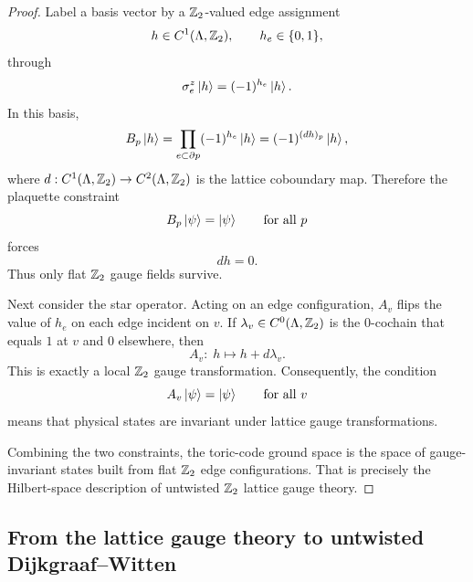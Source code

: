 \begin{proof}
Label a basis vector by a $\mathbb{Z}_2$-valued edge assignment
\begin{equation*}
h\in C^1(\Lambda,\mathbb{Z}_2),
\qquad
h_e\in \{0,1\},
\end{equation*}
through
\begin{equation*}
\sigma_e^z\ket{h}=(-1)^{h_e}\ket{h}.
\end{equation*}
In this basis,
\begin{equation*}
B_p\ket{h}
=
\prod_{e\subset \partial p}(-1)^{h_e}\ket{h}
=
(-1)^{(dh)_p}\ket{h},
\end{equation*}
where $d:C^1(\Lambda,\mathbb{Z}_2)\to C^2(\Lambda,\mathbb{Z}_2)$ is the lattice coboundary map. Therefore the plaquette constraint
\begin{equation*}
B_p\ket{\psi}=\ket{\psi}
\qquad
\text{for all }p
\end{equation*}
forces
\begin{equation}\label{eq:toric-flatness}
dh=0.
\end{equation}
Thus only flat $\mathbb{Z}_2$ gauge fields survive.

\medskip

\noindent Next consider the star operator. Acting on an edge configuration, $A_v$ flips the value of $h_e$ on each edge incident on $v$. If $\lambda_v\in C^0(\Lambda,\mathbb{Z}_2)$ is the $0$-cochain that equals $1$ at $v$ and $0$ elsewhere, then
\begin{equation*}
A_v:\; h\longmapsto h+d\lambda_v.
\end{equation*}
This is exactly a local $\mathbb{Z}_2$ gauge transformation. Consequently, the condition
\begin{equation*}
A_v\ket{\psi}=\ket{\psi}
\qquad
\text{for all }v
\end{equation*}
means that physical states are invariant under lattice gauge transformations.

\medskip

\noindent Combining the two constraints, the toric-code ground space is the space of gauge-invariant states built from flat $\mathbb{Z}_2$ edge configurations. That is precisely the Hilbert-space description of untwisted $\mathbb{Z}_2$ lattice gauge theory.
\end{proof}

\subsection{From the lattice gauge theory to untwisted Dijkgraaf--Witten}

